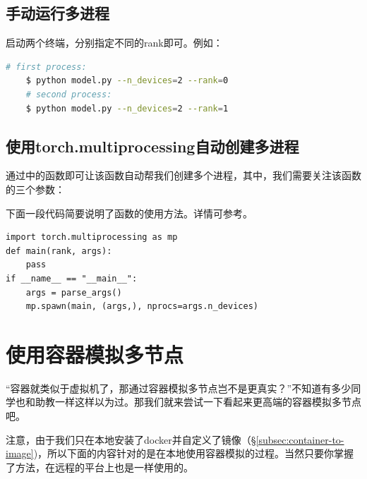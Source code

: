 \subsection{手动运行多进程}
启动两个终端，分别指定不同的rank即可。例如：
\begin{lstlisting}[language=bash]
    # first process:
    $ python model.py --n_devices=2 --rank=0
    # second process:
    $ python model.py --n_devices=2 --rank=1
\end{lstlisting}

\subsection{使用torch.multiprocessing自动创建多进程}

通过中的函数即可让该函数自动帮我们创建多个进程，其中，我们需要关注该函数的三个参数：

下面一段代码简要说明了函数的使用方法。详情可参考。
\begin{lstlisting}
import torch.multiprocessing as mp
def main(rank, args):
    pass
if __name__ == "__main__":
    args = parse_args()
    mp.spawn(main, (args,), nprocs=args.n_devices)
\end{lstlisting}

\section{使用容器模拟多节点}

“容器就类似于虚拟机了，那通过容器模拟多节点岂不是更真实？”不知道有多少同学也和助教一样这样以为过。那我们就来尝试一下看起来更高端的容器模拟多节点吧。

注意，由于我们只在本地安装了docker并自定义了镜像（\S\ref{subsec:container-to-image})，所以下面的内容针对的是在本地使用容器模拟的过程。当然只要你掌握了方法，在远程的平台上也是一样使用的。

